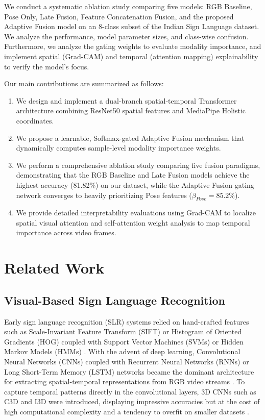 \documentclass[conference]{IEEEtran}
\begin{document}
We conduct a systematic ablation study comparing five models: RGB Baseline, Pose Only, Late Fusion, Feature Concatenation Fusion, and the proposed Adaptive Fusion model on an 8-class subset of the Indian Sign Language dataset. We analyze the performance, model parameter sizes, and class-wise confusion. Furthermore, we analyze the gating weights to evaluate modality importance, and implement spatial (Grad-CAM) and temporal (attention mapping) explainability to verify the model's focus. 

Our main contributions are summarized as follows:
\begin{enumerate}
    \item We design and implement a dual-branch spatial-temporal Transformer architecture combining ResNet50 spatial features and MediaPipe Holistic coordinates.
    \item We propose a learnable, Softmax-gated Adaptive Fusion mechanism that dynamically computes sample-level modality importance weights.
    \item We perform a comprehensive ablation study comparing five fusion paradigms, demonstrating that the RGB Baseline and Late Fusion models achieve the highest accuracy (81.82\%) on our dataset, while the Adaptive Fusion gating network converges to heavily prioritizing Pose features ($\beta_{Pose} = 85.2\%$).
    \item We provide detailed interpretability evaluations using Grad-CAM to localize spatial visual attention and self-attention weight analysis to map temporal importance across video frames.
\end{enumerate}

\section{Related Work}
\subsection{Visual-Based Sign Language Recognition}
Early sign language recognition (SLR) systems relied on hand-crafted features such as Scale-Invariant Feature Transform (SIFT) or Histogram of Oriented Gradients (HOG) coupled with Support Vector Machines (SVMs) or Hidden Markov Models (HMMs) \cite{ref_traditional}. With the advent of deep learning, Convolutional Neural Networks (CNNs) coupled with Recurrent Neural Networks (RNNs) or Long Short-Term Memory (LSTM) networks became the dominant architecture for extracting spatial-temporal representations from RGB video streams \cite{ref_cnnlstm}. To capture temporal patterns directly in the convolutional layers, 3D CNNs such as C3D and I3D were introduced, displaying impressive accuracies but at the cost of high computational complexity and a tendency to overfit on smaller datasets \cite{ref_3dcnn}.
\end{document}
